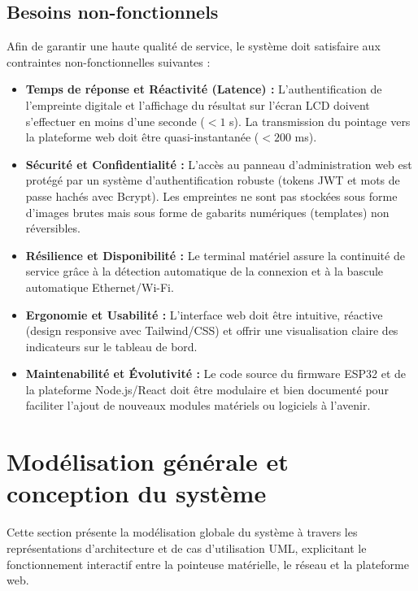 \documentclass[12pt,a4paper]{report}
\begin{document}
\subsection{Besoins non-fonctionnels}
Afin de garantir une haute qualité de service, le système doit satisfaire aux contraintes non-fonctionnelles suivantes :
\begin{itemize}
    \item \textbf{Temps de réponse et Réactivité (Latence) :} L'authentification de l'empreinte digitale et l'affichage du résultat sur l'écran LCD doivent s'effectuer en moins d'une seconde ($< 1$ s). La transmission du pointage vers la plateforme web doit être quasi-instantanée ($< 200$ ms).
    \item \textbf{Sécurité et Confidentialité :} L'accès au panneau d'administration web est protégé par un système d'authentification robuste (tokens JWT et mots de passe hachés avec Bcrypt). Les empreintes ne sont pas stockées sous forme d'images brutes mais sous forme de gabarits numériques (templates) non réversibles.
    \item \textbf{Résilience et Disponibilité :} Le terminal matériel assure la continuité de service grâce à la détection automatique de la connexion et à la bascule automatique Ethernet/Wi-Fi.
    \item \textbf{Ergonomie et Usabilité :} L'interface web doit être intuitive, réactive (design responsive avec Tailwind/CSS) et offrir une visualisation claire des indicateurs sur le tableau de bord.
    \item \textbf{Maintenabilité et Évolutivité :} Le code source du firmware ESP32 et de la plateforme Node.js/React doit être modulaire et bien documenté pour faciliter l'ajout de nouveaux modules matériels ou logiciels à l'avenir.
\end{itemize}

\section{Modélisation générale et conception du système}
Cette section présente la modélisation globale du système à travers les représentations d'architecture et de cas d'utilisation UML, explicitant le fonctionnement interactif entre la pointeuse matérielle, le réseau et la plateforme web.
\end{document}
